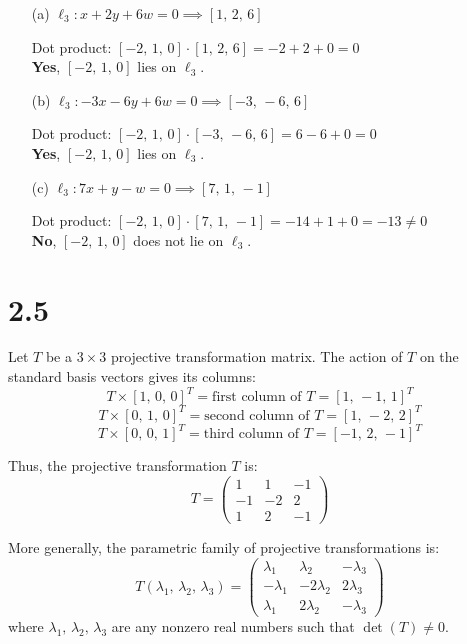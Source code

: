 \documentclass[12pt]{article}
\begin{document}
\begin{enumerate}
    \item[(a)] $\ell_3: x + 2y + 6w = 0 \implies [1,\, 2,\, 6]$
    
    Dot product: $[-2,\, 1,\, 0] \cdot [1,\, 2,\, 6] = -2 + 2 + 0 = 0$ \\
    \textbf{Yes}, $[-2,\, 1,\, 0]$ lies on $\ell_3$.

    \item[(b)] $\ell_3: -3x - 6y + 6w = 0 \implies [-3,\, -6,\, 6]$
    
    Dot product: $[-2,\, 1,\, 0] \cdot [-3,\, -6,\, 6] = 6 - 6 + 0 = 0$ \\
    \textbf{Yes}, $[-2,\, 1,\, 0]$ lies on $\ell_3$.

    \item[(c)] $\ell_3: 7x + y - w = 0 \implies [7,\, 1,\, -1]$
    
    Dot product: $[-2,\, 1,\, 0] \cdot [7,\, 1,\, -1] = -14 + 1 + 0 = -13 \neq 0$ \\
    \textbf{No}, $[-2,\, 1,\, 0]$ does not lie on $\ell_3$.
\end{enumerate}

\section*{2.5}

Let $T$ be a $3 \times 3$ projective transformation matrix. The action of $T$ on the standard basis vectors gives its columns:
\[
T \times [1,\,0,\,0]^T = \text{first column of } T = [1,\,-1,\,1]^T
\]
\[
T \times [0,\,1,\,0]^T = \text{second column of } T = [1,\,-2,\,2]^T
\]
\[
T \times [0,\,0,\,1]^T = \text{third column of } T = [-1,\,2,\,-1]^T
\]

Thus, the projective transformation $T$ is:
\[
T = \begin{pmatrix}
1 & 1 & -1 \\
-1 & -2 & 2 \\
1 & 2 & -1
\end{pmatrix}
\]

More generally, the parametric family of projective transformations is:
\[
T(\lambda_1,\,\lambda_2,\,\lambda_3) = \begin{pmatrix}
\lambda_1 & \lambda_2 & -\lambda_3 \\
-\lambda_1 & -2\lambda_2 & 2\lambda_3 \\
\lambda_1 & 2\lambda_2 & -\lambda_3
\end{pmatrix}
\]
where $\lambda_1,\,\lambda_2,\,\lambda_3$ are any nonzero real numbers such that $\det(T) \neq 0$.
\end{document}
